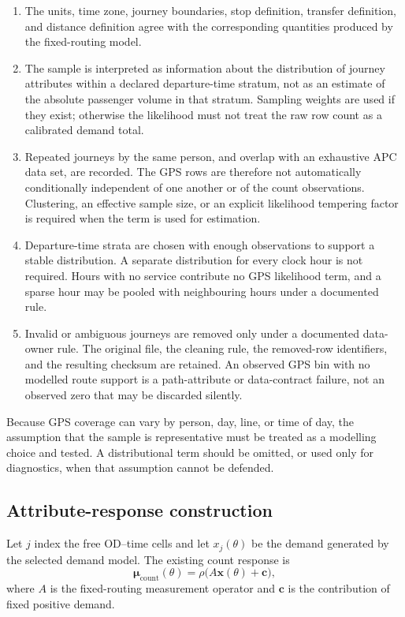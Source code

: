 \begin{enumerate}
  \item The units, time zone, journey boundaries, stop definition, transfer
    definition, and distance definition agree with the corresponding quantities
    produced by the fixed-routing model.
  \item The sample is interpreted as information about the distribution of
    journey attributes within a declared departure-time stratum, not as an
    estimate of the absolute passenger volume in that stratum.  Sampling weights
    are used if they exist; otherwise the likelihood must not treat the raw row
    count as a calibrated demand total.
  \item Repeated journeys by the same person, and overlap with an exhaustive
    APC data set, are recorded.  The GPS rows are therefore not automatically
    conditionally independent of one another or of the count observations.
    Clustering, an effective sample size, or an explicit likelihood tempering
    factor is required when the term is used for estimation.
  \item Departure-time strata are chosen with enough observations to support a
    stable distribution.  A separate distribution for every clock hour is not
    required.  Hours with no service contribute no GPS likelihood term, and a
    sparse hour may be pooled with neighbouring hours under a documented rule.
  \item Invalid or ambiguous journeys are removed only under a documented
    data-owner rule.  The original file, the cleaning rule, the removed-row
    identifiers, and the resulting checksum are retained.  An observed GPS bin
    with no modelled route support is a path-attribute or data-contract failure,
    not an observed zero that may be discarded silently.
\end{enumerate}

Because GPS coverage can vary by person, day, line, or time of day, the
assumption that the sample is representative must be treated as a modelling
choice and tested.  A distributional term should be omitted, or used only for
diagnostics, when that assumption cannot be defended.

\subsection{Attribute-response construction}

Let $j$ index the free OD--time cells and let $x_j(\theta)$ be the demand
generated by the selected demand model.  The existing count response is
\begin{equation}
  \boldsymbol{\mu}_{\mathrm{count}}(\theta)
  =\rho\bigl(A\boldsymbol{x}(\theta)+\boldsymbol{c}\bigr),
\end{equation}
where $A$ is the fixed-routing measurement operator and $\boldsymbol{c}$ is
the contribution of fixed positive demand.


